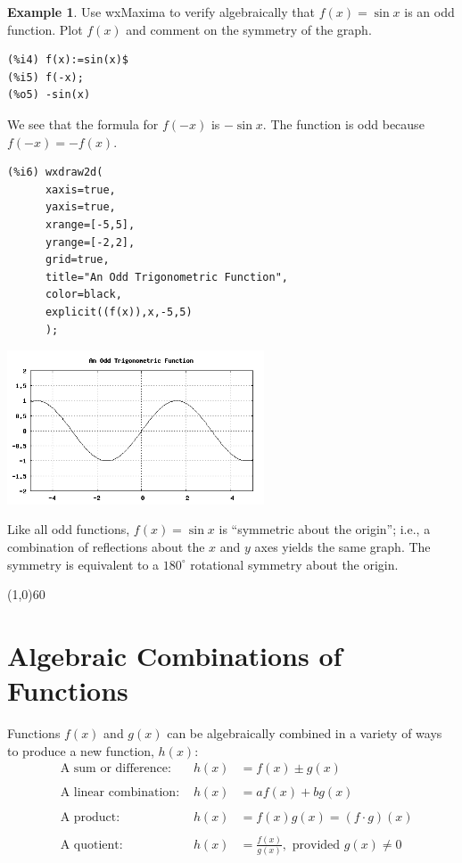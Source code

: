 \documentclass[10.5pt,twoside]{report}
\theoremstyle{definition}
\newtheorem{exmp}{Example}[section]
\begin{document}
\pagebreak
\begin{exmp}
Use wxMaxima to verify algebraically that $f(x)=\sin{x}$ is an odd function.  Plot $f(x)$ and comment on the symmetry of the graph.\\

\begin{verbatim}
(%i4) f(x):=sin(x)$
(%i5) f(-x);
(%o5) -sin(x)
\end{verbatim}

We see that the formula for $f(-x)$ is $-\sin{x}$.  The function is odd because $f(-x)=-f(x)$.  

\begin{verbatim}
(%i6) wxdraw2d(
      xaxis=true,
      yaxis=true,
      xrange=[-5,5],
      yrange=[-2,2],
      grid=true,
      title="An Odd Trigonometric Function",
      color=black,
      explicit((f(x)),x,-5,5)
      );
\end{verbatim}

\includegraphics[width=3in]{example_2_1_2}

Like all odd functions, $f(x)=\sin{x}$ is ``symmetric about the origin''; i.e., a combination of reflections about the $x$ and $y$ axes yields the same graph.  The symmetry is equivalent to a $180^\circ$ rotational symmetry about the origin.

\end{exmp}

\line(1,0){60}
\linethickness{0.5mm}

\pagebreak

\section{Algebraic Combinations of Functions}\label{Algebraic Combinations of Functions}

Functions $f(x)$ and $g(x)$ can be algebraically combined in a variety of ways to produce a new function, $h(x)$:\\
  
\begin{align*}  
&\text{A sum or difference:  } & h(x)&=f(x) \pm g(x) \\
  \\
&\text{A linear combination: } & h(x)&=af(x)+bg(x)\\
  \\
&\text{A product:  } & h(x)&=f(x)g(x)=(f\cdot g)(x)\\
  \\
&\text{A quotient:  } & h(x)&=\frac{f(x)}{g(x)}, \text{ provided }g(x)\neq 0 
\end{align*}
\end{document}
